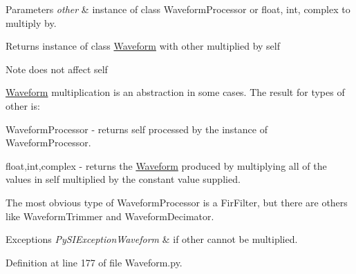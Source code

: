 \begin{DoxyParams}{Parameters}
{\em other} & instance of class Waveform\+Processor or float, int, complex to multiply by. \\
\hline
\end{DoxyParams}
\begin{DoxyReturn}{Returns}
instance of class \hyperlink{classSignalIntegrity_1_1TimeDomain_1_1Waveform_1_1Waveform_1_1Waveform}{Waveform} with other multiplied by self 
\end{DoxyReturn}
\begin{DoxyNote}{Note}
does not affect self 

\hyperlink{classSignalIntegrity_1_1TimeDomain_1_1Waveform_1_1Waveform_1_1Waveform}{Waveform} multiplication is an abstraction in some cases. The result for types of other is\+:
\begin{DoxyItemize}
\item Waveform\+Processor -\/ returns self processed by the instance of Waveform\+Processor.
\item float,int,complex -\/ returns the \hyperlink{classSignalIntegrity_1_1TimeDomain_1_1Waveform_1_1Waveform_1_1Waveform}{Waveform} produced by multiplying all of the values in self multiplied by the constant value supplied. 
\end{DoxyItemize}

The most obvious type of Waveform\+Processor is a Fir\+Filter, but there are others like Waveform\+Trimmer and Waveform\+Decimator. 
\end{DoxyNote}

\begin{DoxyExceptions}{Exceptions}
{\em Py\+S\+I\+Exception\+Waveform} & if other cannot be multiplied. \\
\hline
\end{DoxyExceptions}


Definition at line 177 of file Waveform.\+py.

\mbox{\label{classSignalIntegrity_1_1TimeDomain_1_1Waveform_1_1Waveform_1_1Waveform_aa0b54a20b36fcc55e1147de88d083072}} 
